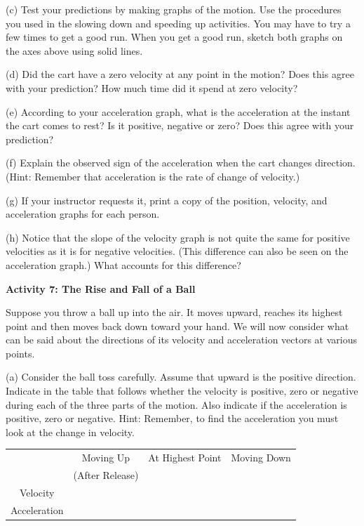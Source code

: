 (c) Test your predictions by making graphs of the motion. Use the procedures
you used in the slowing down and speeding up activities. You may have to try
a few times to get a good run. When you get a good run, sketch both graphs on the axes above using solid lines.

\pagebreak[2]
(d) Did the cart have a zero velocity at any point in the motion? Does this agree with your prediction? How much time did it spend at zero velocity?
\answerspace{20mm}

(e) According to your acceleration graph, what is the acceleration at the instant
the cart comes to rest? Is it positive, negative or zero? Does this agree with
your prediction? 
\answerspace{20mm}

(f) Explain the observed sign of the acceleration when the cart changes direction. (Hint: Remember that acceleration is the rate of change of velocity.) 
\answerspace{20mm}

(g) If your instructor requests it, print a copy of the position, velocity, and acceleration graphs for each person.

(h) Notice that the slope of the velocity graph is not quite the same for positive velocities as it is for negative velocities. (This difference can also be seen on the acceleration graph.) What accounts for this difference?
\answerspace{20mm}

\textbf{Activity 7: The Rise and Fall of a Ball} 

Suppose you throw a ball up into the air. It moves upward, reaches its highest
point and then moves back down toward your hand. We will now consider what can be said about the directions of its velocity and acceleration vectors at various points.

(a) Consider the ball toss carefully. Assume that upward is the positive direction.
Indicate in the table that follows whether the velocity is positive, zero or
negative during each of the three parts of the motion. Also indicate if the
acceleration is positive, zero or negative. Hint: Remember, to find the acceleration
you must look at the change in velocity.

\vspace{0.3cm}
{\centering \begin{tabular}{|c|c|c|c|}
\hline 
&
Moving Up&
At Highest Point&
Moving Down\\
&
(After Release)&
&
\\
\hline 
Velocity&
&
&
\\
\hline 
Acceleration&
&
&
\\
\hline 
\end{tabular}\par}
\vspace{0.3cm}

